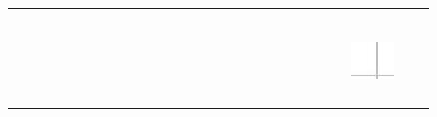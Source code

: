 \documentclass[10pt]{article}
\begin{document}
\begin{center}
\begin{tabular}{|c|c|c|c|c|c|c|c|c|c|c|c|c|c|c|c|c|c|c|c|c|c|c|c|c|c|c|}
\hline
 &  &  &  &  &  &  &  &  &  &  &  &  &  &  &  &  &  &  &  &  &  &  &  &  &  &  \\
\hline
 &  &  &  &  &  &  &  &  &  &  &  &  &  &  &  &  &  &  &  &  &  &  &  &  &  &  \\
\hline
 &  &  &  &  &  &  &  &  &  &  &  &  &  &  &  &  &  &  &  &  &  &  &  &  &  &  \\
\hline
 &  &  &  &  &  &  &  &  &  &  &  &  &  &  &  &  &  &  &  &  &  &  &  &  &  &  \\
\hline
 &  &  &  &  &  &  &  &  &  &  &  &  &  &  &  &  &  &  &  &  &  &  &  &  &  &  \\
\hline
 &  &  &  &  &  &  &  &  &  &  &  &  &  &  &  &  &  &  &  &  &  &  &  &  &  &  \\
\hline
 &  &  &  &  &  &  &  &  &  &  &  &  &  &  &  &  &  &  &  &  &  &  &  &  &  &  \\
\hline
 &  &  &  &  &  &  &  &  &  &  &  &  &  &  &  &  &  &  &  &  &  &  &  & \includegraphics[max width=\textwidth]{2024_11_21_d51d653f4fe4a5bb0c33g-15}
 &  &  \\
\hline
 &  &  &  &  &  &  &  &  &  &  &  &  &  &  &  &  &  &  &  &  &  &  &  &  &  &  \\
\hline
 &  &  &  &  &  &  &  &  &  &  &  &  &  &  &  &  &  &  &  &  &  &  &  &  &  &  \\
\hline
 &  &  &  &  &  &  &  &  &  &  &  &  &  &  &  &  &  &  &  &  &  &  &  &  &  &  \\
\hline
 &  &  &  &  &  &  &  &  &  &  &  &  &  &  &  &  &  &  &  &  &  &  &  &  &  &  \\

\end{tabular}
\end{center}
\end{document}
